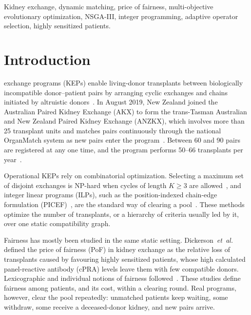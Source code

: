 \documentclass[journal]{IEEEtran}
\begin{document}
\begin{IEEEkeywords}
Kidney exchange, dynamic matching, price of fairness,
multi-objective evolutionary optimization, NSGA-III, integer
programming, adaptive operator selection, highly sensitized patients.
\end{IEEEkeywords}

\section{Introduction}
\label{sec:intro}

 exchange programs (KEPs) enable living-donor
transplants between biologically incompatible donor--patient pairs by
arranging cyclic exchanges and chains initiated by altruistic
donors~\cite{roth2004kidney}.
In August 2019, New Zealand joined the Australian Paired Kidney Exchange
(AKX) to form the trans-Tasman Australian and New Zealand Paired Kidney
Exchange (ANZKX), which involves more than 25 transplant units and
matches pairs continuously through the national OrganMatch system as
new pairs enter the program~\cite{anzkxprotocol2021}.
Between 60 and 90 pairs are registered at any one time, and the
program performs 50--66 transplants per year~\cite{ANZKX2021,DonateLife2024}.

Operational KEPs rely on combinatorial optimization.
Selecting a maximum set of disjoint exchanges is NP-hard when cycles of
length $K \geq 3$ are allowed~\cite{abraham2007clearing}, and integer
linear programs (ILPs), such as the position-indexed chain-edge
formulation (PICEF)~\cite{dickerson2016picef}, are the standard way of
clearing a pool~\cite{biro2021modelling}.
These methods optimize the number of transplants, or a hierarchy of
criteria usually led by it, over one static compatibility graph.

Fairness has mostly been studied in the same static setting.
Dickerson~\textit{et~al.}~\cite{dickerson2014price} defined the price of
fairness (PoF) in kidney exchange as the relative loss of transplants
caused by favouring highly sensitized patients, whose high calculated
panel-reactive antibody (cPRA) levels leave them with few compatible
donors.
Lexicographic and individual notions of fairness
followed~\cite{mcelfresh2018balancing,farnadi2021individual}.
These studies define fairness among patients, and its cost, within a
clearing round.
Real programs, however, clear the pool repeatedly: unmatched patients
keep waiting, some withdraw, some receive a deceased-donor kidney, and
new pairs arrive.
\end{document}
